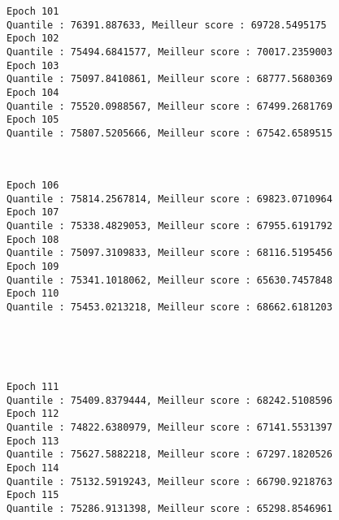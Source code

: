 \documentclass[11pt]{article}
\begin{document}
    \begin{Verbatim}[commandchars=\\\{\}]
Epoch 101
Quantile : 76391.887633, Meilleur score : 69728.5495175
Epoch 102
Quantile : 75494.6841577, Meilleur score : 70017.2359003
Epoch 103
Quantile : 75097.8410861, Meilleur score : 68777.5680369
Epoch 104
Quantile : 75520.0988567, Meilleur score : 67499.2681769
Epoch 105
Quantile : 75807.5205666, Meilleur score : 67542.6589515

    \end{Verbatim}

    \begin{center}
    \end{center}
    { \hspace*{\fill} \\}
    
    \begin{Verbatim}[commandchars=\\\{\}]
Epoch 106
Quantile : 75814.2567814, Meilleur score : 69823.0710964
Epoch 107
Quantile : 75338.4829053, Meilleur score : 67955.6191792
Epoch 108
Quantile : 75097.3109833, Meilleur score : 68116.5195456
Epoch 109
Quantile : 75341.1018062, Meilleur score : 65630.7457848
Epoch 110
Quantile : 75453.0213218, Meilleur score : 68662.6181203

    \end{Verbatim}

    \begin{center}
    \end{center}
    { \hspace*{\fill} \\}
    
    \begin{center}
    \end{center}
    { \hspace*{\fill} \\}
    
    \begin{Verbatim}[commandchars=\\\{\}]
Epoch 111
Quantile : 75409.8379444, Meilleur score : 68242.5108596
Epoch 112
Quantile : 74822.6380979, Meilleur score : 67141.5531397
Epoch 113
Quantile : 75627.5882218, Meilleur score : 67297.1820526
Epoch 114
Quantile : 75132.5919243, Meilleur score : 66790.9218763
Epoch 115
Quantile : 75286.9131398, Meilleur score : 65298.8546961

    \end{Verbatim}
\end{document}
